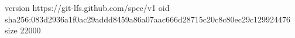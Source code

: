 version https://git-lfs.github.com/spec/v1
oid sha256:083d2936a1f0ac29addd8459a86a07aac666d28715c20c8c80ec29c129924476
size 22000
